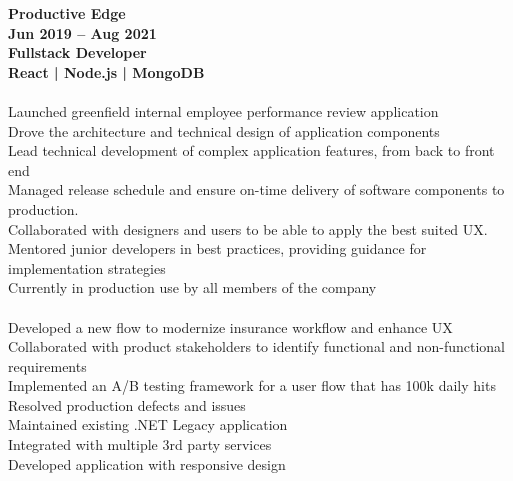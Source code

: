 \documentclass[margin,line]{resume}
\begin{document}
\begin{resume}
    
    
    \textbf{\listing Productive Edge} \vspace{2mm}\\\vspace{0mm} \hfill \textbf{Jun 2019 -- Aug 2021}\\
    \hfill \textbf{Fullstack Developer}\\
    \mbox{} \hfill \textbf{React | Node.js | MongoDB}\\\\
    Launched greenfield internal employee performance review application\\
    Drove the architecture and technical design of application components\\
    Lead technical development of complex application features, from back to front end\\
    Managed release schedule and ensure on-time delivery of software components to production.\\
    Collaborated with designers and users to be able to apply the best suited UX.\\
    Mentored junior developers in best practices, providing guidance for implementation strategies\\
    Currently in production use by all members of the company\\
    \textbf{\listing} \vspace{2mm}\\\vspace{1mm}%
    Developed a new flow to modernize insurance workflow and enhance UX\\
    Collaborated with product stakeholders to identify functional and non-functional requirements\\
    Implemented an A/B testing framework for a user flow that has 100k daily hits\\
    Resolved production defects and issues\\
    Maintained existing .NET Legacy application\\
    Integrated with multiple 3rd party services\\ 
    Developed application with responsive design\\
\sectionline



\end{resume}
\end{document}
